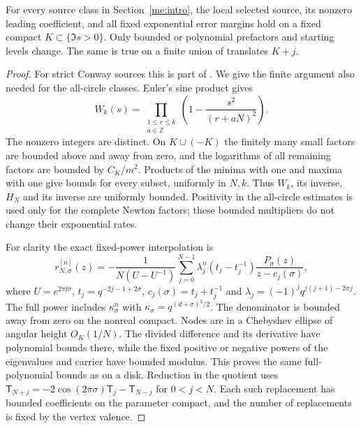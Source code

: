 \begin{lemma}\label{me:translated}
For every source class in Section~\ref{me:intro}, the local selected
source, its nonzero leading coefficient, and all fixed exponential
error margins hold on a fixed compact $K\subset\{\Im s>0\}$.
Only bounded or polynomial prefactors and starting levels change.
The same is true on a finite union of translates $K+j$.
\end{lemma}
\begin{proof}
For strict Conway sources this is part of
\cite[Theorems 1.1--1.2]{MovingSources}. We give the finite argument
also needed for the all-circle classes. Euler's sine product gives
\begin{equation}\label{me:subset}
 W_k(s)=\prod_{\substack{1\le r\le k\\a\in\mathbb Z}}
                  \left(1-\frac{s^2}{(r+aN)^2}\right).
\end{equation}
The nonzero integers are distinct. On $K\cup(-K)$ the finitely
many small factors are bounded above and away from zero, and the
logarithms of all remaining factors are bounded by $C_K/m^2$.
Products of the minima with one and maxima with one give bounds
for every subset, uniformly in $N,k$. Thus $W_k$, its inverse,
$H_N$ and its inverse are uniformly bounded. Positivity in the
all-circle estimates is used only for the complete Newton factors;
these bounded multipliers do not change their exponential rates.

For clarity the exact fixed-power interpolation is
\begin{equation}\label{me:crossing}
 r_{N,\sigma}^{[n]}(z)=
 -\frac1{N(U-U^{-1})}\sum_{j=0}^{N-1}
 \lambda_j^n(t_j-t_j^{-1})\frac{P_\sigma(z)}{z-c_j(\sigma)},
\end{equation}
where $U=e^{2\pi\ii\sigma}$,
$t_j=q^{-2j-1+2\sigma}$, $c_j(\sigma)=t_j+t_j^{-1}$ and
$\lambda_j=(-1)^jq^{j(j+1)-2\sigma j}$.
The full power includes $\kappa_\sigma^n$ with
$\kappa_\sigma=q^{(d+\sigma)^2/2}$. The denominator is bounded
away from zero on the nonreal compact. Nodes are in a Chebyshev
ellipse of angular height $O_K(1/N)$. The divided difference and
its derivative have polynomial bounds there, while the fixed
positive or negative powers of the eigenvalues and carrier have
bounded modulus. This proves the same full-polynomial bounds as
on a disk. Reduction in the quotient uses
$\mathsf T_{N+j}=-2\cos(2\pi\sigma)\mathsf T_j-\mathsf T_{N-j}$
for $0<j<N$. Each such replacement has bounded coefficients on
the parameter compact, and the number of replacements is fixed
by the vertex valence.


\end{proof}

